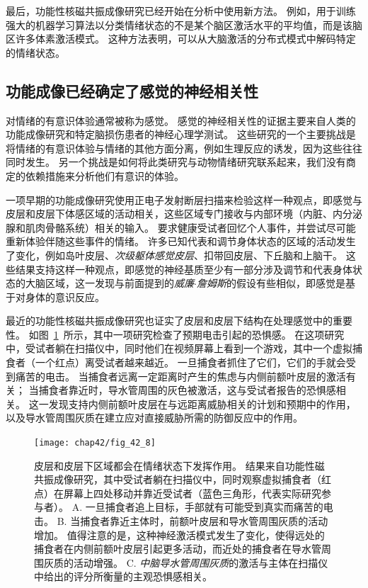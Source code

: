 最后，功能性核磁共振成像研究已经开始在分析中使用新方法。
例如，用于训练强大的机器学习算法以分类情绪状态的不是某个脑区激活水平的平均值，而是该脑区许多体素激活模式。
这种方法表明，可以从大脑激活的分布式模式中解码特定的情绪状态。



\subsection{功能成像已经确定了感觉的神经相关性}

对情绪的有意识体验通常被称为感觉。
感觉的神经相关性的证据主要来自人类的功能成像研究和特定脑损伤患者的神经心理学测试。
这些研究的一个主要挑战是将情绪的有意识体验与情绪的其他方面分离，例如生理反应的诱发，因为这些往往同时发生。
另一个挑战是如何将此类研究与动物情绪研究联系起来，我们没有商定的依赖措施来分析他们有意识的体验。


一项早期的功能成像研究使用正电子发射断层扫描来检验这样一种观点，即感觉与皮层和皮层下体感区域的活动相关，这些区域专门接收与内部环境（内脏、内分泌腺和肌肉骨骼系统）相关的输入。
要求健康受试者回忆个人事件，并尝试尽可能重新体验伴随这些事件的情绪。
许多已知代表和调节身体状态的区域的活动发生了变化，例如岛叶皮层、\textit{次级躯体感觉皮层}、扣带回皮层、下丘脑和上脑干。
这些结果支持这样一种观点，即感觉的神经基质至少有一部分涉及调节和代表身体状态的大脑区域，这一发现与前面提到的\textit{威廉$\cdot$詹姆斯}的假设有些相似，即感觉是基于对身体的意识反应。


最近的功能性核磁共振成像研究也证实了皮层和皮层下结构在处理感觉中的重要性。
如图~\ref{fig:42_8}~所示，其中一项研究检查了预期电击引起的恐惧感。
在这项研究中，受试者躺在扫描仪中，同时他们在视频屏幕上看到一个游戏，其中一个虚拟捕食者（一个红点）离受试者越来越近。
一旦捕食者抓住了它们，它们的手就会受到痛苦的电击。
当捕食者远离一定距离时产生的焦虑与内侧前额叶皮层的激活有关；
当捕食者靠近时，导水管周围的灰色被激活，这与受试者报告的恐惧感相关。
这一发现支持内侧前额叶皮层在与远距离威胁相关的计划和预期中的作用，以及导水管周围灰质在建立应对直接威胁所需的防御反应中的作用。


\begin{figure}[htbp]
	\centering
	\texttt{[image: chap42/fig\_42\_8]}
	\caption{皮层和皮层下区域都会在情绪状态下发挥作用。
		结果来自功能性磁共振成像研究，其中受试者躺在扫描仪中，同时观察虚拟捕食者（红点）在屏幕上四处移动并靠近受试者（蓝色三角形，代表实际研究参与者）。
		A. 一旦捕食者追上目标，手部就有可能受到真实而痛苦的电击。
		B. 当捕食者靠近主体时，前额叶皮层和导水管周围灰质的活动增加。
		值得注意的是，这种神经激活模式发生了变化，使得远处的捕食者在内侧前额叶皮层引起更多活动，而近处的捕食者在导水管周围灰质的活动增强。
		C. \textit{中脑导水管周围灰质}的激活与主体在扫描仪中给出的评分所衡量的主观恐惧感相关。}
	\label{fig:42_8}
\end{figure}


